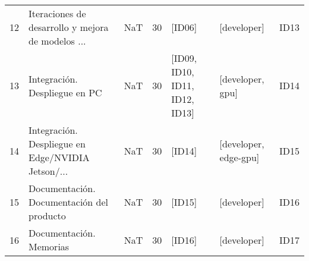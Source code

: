 \begin{tabular}{lllrlll}
12 &  Iteraciones de desarrollo y mejora de modelos ... &                        NaT &        30 &                          [ID06] &            [developer] &    ID13 \\
13 &                      Integración. Despliegue en PC &                        NaT &        30 &  [ID09, ID10, ID11, ID12, ID13] &       [developer, gpu] &    ID14 \\
14 &  Integración. Despliegue en Edge/NVIDIA Jetson/... &                        NaT &        30 &                          [ID14] &  [developer, edge-gpu] &    ID15 \\
15 &          Documentación. Documentación del producto &                        NaT &        30 &                          [ID15] &            [developer] &    ID16 \\
16 &                            Documentación. Memorias &                        NaT &        30 &                          [ID16] &            [developer] &    ID17 \\
\bottomrule
\end{tabular}
